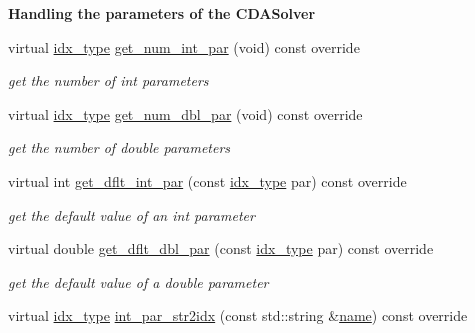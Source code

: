 \begin{Indent}\textbf{ Handling the parameters of the C\+D\+A\+Solver}\par
\begin{DoxyCompactItemize}
\item 
virtual \mbox{\hyperlink{class_s_m_spp__di__unipi__it_1_1_thin_compute_interface_aa3d710629ad8c434286726ad810c3b47}{idx\+\_\+type}} \mbox{\hyperlink{class_s_m_spp__di__unipi__it_1_1_c_d_a_solver_a3ad74d9506761eb2ca4c8a936fb7a1c5}{get\+\_\+num\+\_\+int\+\_\+par}} (void) const override
\begin{DoxyCompactList}\small\item\em get the number of int parameters \end{DoxyCompactList}\item 
virtual \mbox{\hyperlink{class_s_m_spp__di__unipi__it_1_1_thin_compute_interface_aa3d710629ad8c434286726ad810c3b47}{idx\+\_\+type}} \mbox{\hyperlink{class_s_m_spp__di__unipi__it_1_1_c_d_a_solver_a842fd454acaded84baf6b77e0d61a950}{get\+\_\+num\+\_\+dbl\+\_\+par}} (void) const override
\begin{DoxyCompactList}\small\item\em get the number of double parameters \end{DoxyCompactList}\item 
virtual int \mbox{\hyperlink{class_s_m_spp__di__unipi__it_1_1_c_d_a_solver_a75dd1491b74c4b9476755e061dce3e04}{get\+\_\+dflt\+\_\+int\+\_\+par}} (const \mbox{\hyperlink{class_s_m_spp__di__unipi__it_1_1_thin_compute_interface_aa3d710629ad8c434286726ad810c3b47}{idx\+\_\+type}} par) const override
\begin{DoxyCompactList}\small\item\em get the default value of an int parameter \end{DoxyCompactList}\item 
virtual double \mbox{\hyperlink{class_s_m_spp__di__unipi__it_1_1_c_d_a_solver_a465a771c115acf8d5f4e32e22f003014}{get\+\_\+dflt\+\_\+dbl\+\_\+par}} (const \mbox{\hyperlink{class_s_m_spp__di__unipi__it_1_1_thin_compute_interface_aa3d710629ad8c434286726ad810c3b47}{idx\+\_\+type}} par) const override
\begin{DoxyCompactList}\small\item\em get the default value of a double parameter \end{DoxyCompactList}\item 
virtual \mbox{\hyperlink{class_s_m_spp__di__unipi__it_1_1_thin_compute_interface_aa3d710629ad8c434286726ad810c3b47}{idx\+\_\+type}} \mbox{\hyperlink{class_s_m_spp__di__unipi__it_1_1_c_d_a_solver_ae281b6699b0707a5cdc1e82b76d26c09}{int\+\_\+par\+\_\+str2idx}} (const std\+::string \&\mbox{\hyperlink{class_s_m_spp__di__unipi__it_1_1_solver_a81dba299d9c4ccc6c1e6be0a845142fd}{name}}) const override

\end{DoxyCompactItemize}
\end{Indent}
